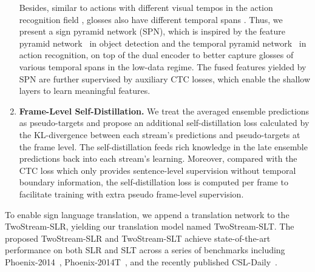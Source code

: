 \documentclass{article}
\begin{document}
\begin{enumerate}[leftmargin=0.5cm]
    Besides, similar to actions with different visual tempos in the action recognition field \cite{yang2020temporal}, glosses also have different temporal spans \cite{saunders2020progressive}. Thus, we present a sign pyramid network (SPN), which is inspired by the feature pyramid network~\cite{lin2017feature} in object detection and the temporal pyramid network~\cite{yang2020temporal} in action recognition, on top of the dual encoder to better capture glosses of various temporal spans in the low-data regime. The fused features yielded by SPN are further supervised by auxiliary CTC losses, which enable the shallow layers to learn meaningful features.
    
    
\item\textbf{Frame-Level Self-Distillation.}
     We treat the averaged ensemble predictions as pseudo-targets and propose an additional self-distillation loss calculated by the KL-divergence between each stream's predictions and pseudo-targets at the frame level. The self-distillation feeds rich knowledge in the late ensemble predictions back into each stream's learning. Moreover, compared with the CTC loss which only provides sentence-level supervision without temporal boundary information, the self-distillation loss is computed per frame to facilitate training with extra pseudo frame-level supervision.
\end{enumerate}
To enable sign language translation, we append a translation network to the TwoStream-SLR, yielding our translation model named TwoStream-SLT. The proposed TwoStream-SLR and TwoStream-SLT achieve state-of-the-art performance on both SLR and SLT across a series of benchmarks including Phoenix-2014~\cite{P2014}, Phoenix-2014T~\cite{camgoz2018neural}, and the recently published CSL-Daily~\cite{zhou2021improving}. 
\end{document}
